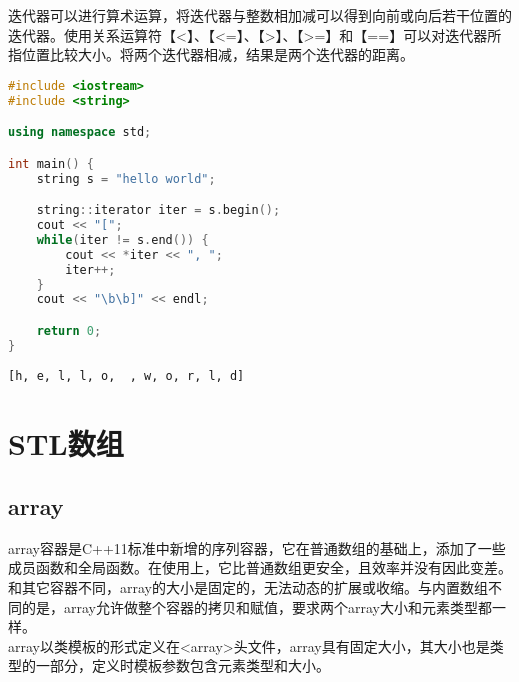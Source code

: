 迭代器可以进行算术运算，将迭代器与整数相加减可以得到向前或向后若干位置的迭代器。使用关系运算符【<】、【<=】、【>】、【>=】和【==】可以对迭代器所指位置比较大小。将两个迭代器相减，结果是两个迭代器的距离。 \\


\begin{lstlisting}[language=C++]
#include <iostream>
#include <string>

using namespace std;

int main() {
    string s = "hello world";

    string::iterator iter = s.begin();
    cout << "[";
    while(iter != s.end()) {
        cout << *iter << ", ";
        iter++;
    }
    cout << "\b\b]" << endl;

    return 0;
}
\end{lstlisting}

\begin{tcolorbox}
	\begin{verbatim}
[h, e, l, l, o,  , w, o, r, l, d]
	\end{verbatim}
\end{tcolorbox}

\newpage

\section{STL数组}

\subsection{array}

array容器是C++11标准中新增的序列容器，它在普通数组的基础上，添加了一些成员函数和全局函数。在使用上，它比普通数组更安全，且效率并没有因此变差。和其它容器不同，array的大小是固定的，无法动态的扩展或收缩。与内置数组不同的是，array允许做整个容器的拷贝和赋值，要求两个array大小和元素类型都一样。 \\

array以类模板的形式定义在<array>头文件，array具有固定大小，其大小也是类型的一部分，定义时模板参数包含元素类型和大小。

